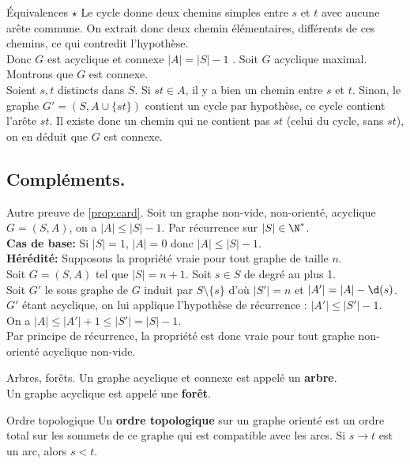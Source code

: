 \documentclass[french, 11pt]{article}
\begin{document}
\begin{prop}{Équivalences $\star$}{}
    Le cycle donne deux chemins simples entre $s$ et $t$ avec aucune arête commune. On extrait donc deux chemin élémentaires, différents de ces chemins, ce qui contredit l'hypothèse.\\
    Donc $G$ est acyclique et connexe $|A|=|S|-1$\n
    . Soit $G$ acyclique maximal. Montrons que $G$ est connexe.\\
    Soient $s,t$ distincts dans $S$. Si $st\in A$, il y a bien un chemin entre $s$ et $t$. Sinon, le graphe $G'=(S,A\cup\{st\})$ contient un cycle par hypothèse, ce cycle contient l'arête $st$. Il existe donc un chemin qui ne contient pas $st$ (celui du cycle, sans $st$), on en déduit que $G$ est connexe.
\end{prop}

\subsection{Compléments.}

\begin{prop}{Autre preuve de \ref{prop:card}.}{}
    Soit un graphe non-vide, non-orienté, acyclique $G=(S,A)$, on a $|A|\leq|S|-1$.
    \tcblower
    Par récurrence sur $|S|\in\N^*$.\\
    \textbf{Cas de base:} Si $|S|=1$, $|A|=0$ donc $|A|\leq|S|-1$.\\
    \textbf{Hérédité:} Supposons la propriété vraie pour tout graphe de taille $n$.\\
    Soit $G=(S,A)$ tel que $|S|=n+1$. Soit $s\in S$ de degré au plus 1.\\
    Soit $G'$ le sous graphe de $G$ induit par $S\setminus\{s\}$ d'où $|S'| = n$ et $|A'|=|A|-\d(s)$.\\
    $G'$ étant acyclique, on lui applique l'hypothèse de récurrence : $|A'|\leq|S'|-1$.\\
    On a $|A|\leq|A'|+1\leq|S'|=|S|-1$.\\
    Par principe de récurrence, la propriété est donc vraie pour tout graphe non-orienté acyclique non-vide.
\end{prop}

\begin{defi}{Arbres, forêts.}{}
    Un graphe acyclique et connexe est appelé un \textbf{arbre}.\\
    Un graphe acyclique est appelé une \textbf{forêt}. 
\end{defi}

\begin{defi}{Ordre topologique}{}
    Un \textbf{ordre topologique} sur un graphe orienté est un ordre total sur les sommets de ce graphe qui est compatible avec les arcs. Si $s\to t$ est un arc, alors $s<t$.
\end{defi}
\end{document}
